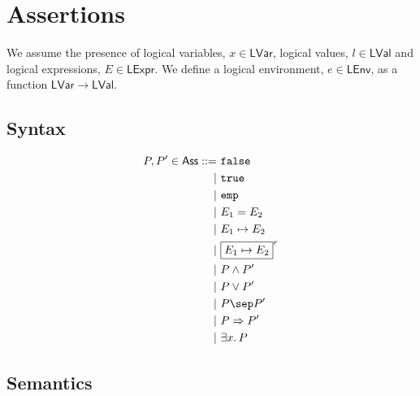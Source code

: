 \section{Assertions}

We assume the presence of logical variables, $x \in \mathsf{LVar}$, logical values, $l \in \mathsf{LVal}$ and logical expressions, $E \in \mathsf{LExpr}$. We define a logical environment, $e \in \mathsf{LEnv}$, as a function $\mathsf{LVar} \rightarrow \mathsf{LVal}$.

\subsection{Syntax}

\begin{align*}
P, P' \in \mathsf{Ass} ::=&
\ \mathtt{false} \\
|&\ \mathtt{true} \\
|&\ \mathtt{emp} \\
|&\ E_1 = E_2 \\
|&\ E_1 \mapsto E_2 \\
|&\ \boxed{E_1 \mapsto E_2}^r \\
|&\ P \land P' \\
|&\ P \lor P' \\
|&\ P \sep P' \\
|&\ P \Rightarrow P' \\
|&\ \exists x \ldotp P
\end{align*}

\subsection{Semantics}

